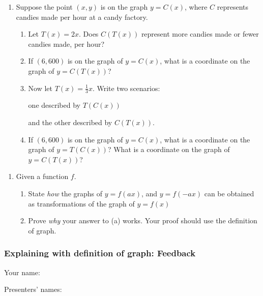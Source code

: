 \documentclass[11pt]{article}
\newcommand{\handout}{\subsubsection}
\theoremstyle{definition}
\begin{document}
\begin{enumerate}
\item Suppose the point $(x,y)$ is on the graph $y=C(x)$, where $C$ represents candies made per hour at a candy factory. 

\begin{enumerate}
\item Let $T(x)=2x$. Does $C(T(x))$ represent more candies made or fewer candies made, per hour? 
\item If $(6,600)$ is on the graph of $y=C(x)$, what is a coordinate on the graph of $y=C(T(x))$?
\item Now let $T(x)=\frac{1}{3}x$. Write two scenarios:

	\centerline{one described by $T(C(x))$} 
	
	\centerline{and the other described by $C(T(x))$.}

\item If $(6,600)$ is on the graph of $y=C(x)$, what is a coordinate on the graph of $y=T(C(x))$? What is a coordinate on the graph of $y=C(T(x))$?
\end{enumerate}
\end{enumerate}

\vfill

\begin{enumerate}[resume]
\item Given a function $f$.
	\begin{enumerate}
	\item State {\it how} the graphs of $y=f(ax)$, and $y=f(-ax)$ can be obtained as transformations of the graph of $y=f(x)$
	\item Prove {\it why} your answer to (a) works. 	Your proof should use the definition of graph. 		
	\end{enumerate}
\end{enumerate}
\vfill



\newpage
\handout{Explaining with definition of graph: Feedback}

Your name: 

Presenters' names:
\end{document}
